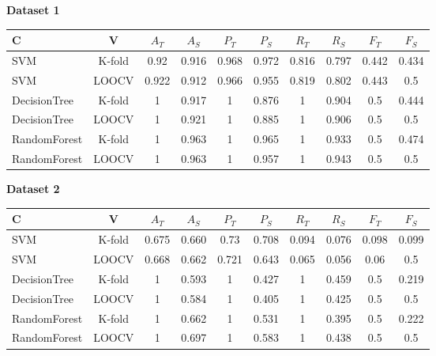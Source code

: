\documentclass{article}
\begin{document}
\begin{center}\textbf{Dataset 1}\end{center}
\begin{center}
\begin{tabular}{| l | c |  c | c | c | c | c | c | c | c |}
    \hline
    \textbf{C} & \textbf{V} & \textbf{$A_T$} & \textbf{$A_S$}
    & \textbf{$P_T$} & \textbf{$P_S$} & \textbf{$R_T$}
    & \textbf{$R_S$} & \textbf{$F_T$} & \textbf{$F_S$} \\
    \hline
    SVM & K-fold & 0.92 & 0.916 & 0.968 & 0.972 & 0.816 & 0.797 & 0.442 & 0.434 \\
    SVM & LOOCV  & 0.922 & 0.912 & 0.966 & 0.955 & 0.819 & 0.802 & 0.443 & 0.5 \\
    DecisionTree & K-fold & 1 & 0.917 & 1 & 0.876 & 1 & 0.904 & 0.5 & 0.444 \\
    DecisionTree & LOOCV & 1 & 0.921 & 1 & 0.885 & 1 & 0.906 & 0.5 & 0.5 \\
    RandomForest & K-fold & 1 & 0.963 & 1 & 0.965 & 1 & 0.933 & 0.5 & 0.474 \\
    RandomForest & LOOCV & 1 & 0.963 & 1 & 0.957 & 1 & 0.943 & 0.5 & 0.5 \\
    \hline
\end{tabular}
\end{center}

\begin{center}\textbf{Dataset 2}\end{center}
\begin{center}
\begin{tabular}{| l | c |  c | c | c | c | c | c | c | c |}
    \hline
    \textbf{C} & \textbf{V} & \textbf{$A_T$} & \textbf{$A_S$}
    & \textbf{$P_T$} & \textbf{$P_S$} & \textbf{$R_T$}
    & \textbf{$R_S$} & \textbf{$F_T$} & \textbf{$F_S$} \\
    \hline
    SVM & K-fold & 0.675 & 0.660 & 0.73 & 0.708 & 0.094 & 0.076 & 0.098 & 0.099 \\
    SVM & LOOCV  & 0.668 & 0.662 & 0.721 & 0.643 & 0.065 & 0.056 & 0.06 & 0.5 \\
    DecisionTree & K-fold & 1 & 0.593 & 1 & 0.427 & 1 & 0.459 & 0.5 & 0.219 \\
    DecisionTree & LOOCV & 1 & 0.584 & 1 & 0.405 & 1 & 0.425 & 0.5 & 0.5 \\
    RandomForest & K-fold & 1 & 0.662 & 1 & 0.531 & 1 & 0.395 & 0.5 & 0.222 \\
    RandomForest & LOOCV & 1 & 0.697 & 1 & 0.583 & 1 & 0.438 & 0.5 & 0.5 \\
    \hline
\end{tabular}
\end{center}
\end{document}
